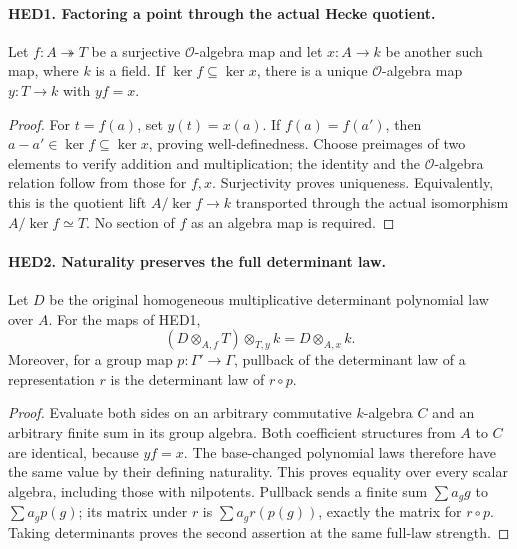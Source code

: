 \documentclass[11pt,a4paper]{article}
\numberwithin{equation}{section}
\theoremstyle{remark}\newtheorem{remark}[theorem]{Remark}
\begin{document}
\paragraph{HED1. Factoring a point through the actual Hecke quotient.}
\label{claim:HED1}
Let \(f:A\twoheadrightarrow T\) be a surjective \(\mathcal O\)-algebra
map and let \(x:A\to k\) be another such map, where \(k\) is a field.
If \(\ker f\subseteq\ker x\), there is a unique
\(\mathcal O\)-algebra map \(y:T\to k\) with \(y f=x\).
\begin{proof}
For \(t=f(a)\), set \(y(t)=x(a)\).  If \(f(a)=f(a')\), then
\(a-a'\in\ker f\subseteq\ker x\), proving well-definedness.
Choose preimages of two elements to verify addition and multiplication;
the identity and the \(\mathcal O\)-algebra relation follow from those
for \(f,x\).  Surjectivity proves uniqueness.  Equivalently, this is
the quotient lift \(A/\ker f\to k\) transported through the actual
isomorphism \(A/\ker f\simeq T\).  No section of \(f\) as an algebra
map is required.
\end{proof}

\paragraph{HED2. Naturality preserves the full determinant law.}
\label{claim:HED2}
Let \(D\) be the original homogeneous multiplicative determinant
polynomial law over \(A\).  For the maps of HED1,
\[
                  (D\otimes_{A,f}T)\otimes_{T,y}k
                              =D\otimes_{A,x}k.
 \tag{HED.2}
\]
Moreover, for a group map \(p:\Gamma'\to\Gamma\), pullback of the
determinant law of a representation \(r\) is the determinant law of
\(r\circ p\).
\begin{proof}
Evaluate both sides on an arbitrary commutative \(k\)-algebra \(C\)
and an arbitrary finite sum in its group algebra.  Both coefficient
structures from \(A\) to \(C\) are identical, because \(yf=x\).
The base-changed polynomial laws therefore have the same value by
their defining naturality.  This proves equality over every scalar
algebra, including those with nilpotents.  Pullback sends a finite sum
\(\sum a_g g\) to \(\sum a_g p(g)\); its matrix under \(r\) is
\(\sum a_g r(p(g))\), exactly the matrix for \(r\circ p\).
Taking determinants proves the second assertion at the same full-law
strength.
\end{proof}

\end{document}
